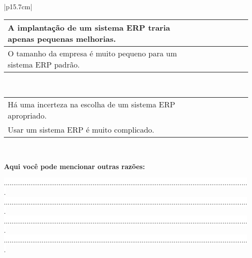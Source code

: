 \begin{longtable}{|p{15.7cm}|}
\begin{tabularx}{15.7 cm}{|X|X|X|X|X|X|X|}
		\hline
		A implantação de um sistema ERP traria apenas pequenas melhorias. &   &   &   &   &   &  \\
		\hline
		O tamanho da empresa é muito pequeno para um sistema ERP padrão. &   &   &   &   &   &  \\
		\hline
	\end{tabularx}\\
	\tiny \begin{tabularx}{15.7 cm}{|X|X|X|X|X|X|X|}
	\hline
		& {\rotatebox[origin=c]{90}{\parbox[c]{2.5cm}{\centering \textcolor{white}{.}\newline \medskip Concordo Completamente}}} 
		& {\rotatebox[origin=c]{90}{\parbox[c]{2.5cm}{\centering \textcolor{white}{.}\newline \medskip Concordo Parcialmente}}} 
		& {\rotatebox[origin=c]{90}{\parbox[c]{2.5cm}{\centering \textcolor{white}{.}\newline \medskip Não Concordo \newline Nem Discordo}}}	 
		& {\rotatebox[origin=c]{90}{\parbox[c]{2.5cm}{\centering \textcolor{white}{.}\newline \medskip Discordo  Parcialmente }}} 
		& {\rotatebox[origin=c]{90}{\parbox[c]{2.5cm}{\centering \textcolor{white}{.}\newline \medskip Discordo  Completamente  }}}
		& {\rotatebox[origin=c]{90}{\parbox[c]{2.5cm}{\centering \textcolor{white}{.}\newline  \textcolor{white}{.}\newline Eu Não Sei }}} \\
		\hline
		Há uma incerteza na escolha de um sistema ERP apropriado. &   &   &   &   &   &  \\
		\hline
		Usar um sistema ERP é muito complicado. &   &   &   &   &   &  \\
		\hline
	\end{tabularx}\\
	\begin{Spacing}{1.0} \end{Spacing}
	\begin{Spacing}{0.8} 
		\textbf{Aqui você pode mencionar outras razões:} \end{Spacing} 
	\begin{Spacing}{2.5} \end{Spacing} 
	\colorbox{white}{ .................................................................................................................................. } \\
	\colorbox{white}{ .................................................................................................................................. } \\
	\colorbox{white}{ .................................................................................................................................. } \\
	\colorbox{white}{ .................................................................................................................................. } \\
	\hline
\end{longtable}

